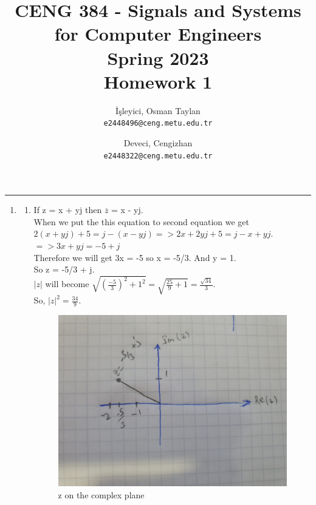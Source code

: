 \documentclass[10pt,a4paper, margin=1in]{article}
\author{
  İşleyici, Osman Taylan\\
  \texttt{e2448496@ceng.metu.edu.tr}
  \and
  Deveci, Cengizhan\\
  \texttt{e2448322@ceng.metu.edu.tr}
}
\title{CENG 384 - Signals and Systems for Computer Engineers \\
Spring 2023 \\
Homework 1}
\begin{document}
\maketitle



\noindent\rule{19cm}{1.2pt}

\begin{enumerate}

    \item %
          \begin{enumerate}
              \item %
              If z = x + yj then $\overline{z}$ = x - yj. \\
              
              When we put the this equation to second equation we get $2(x + yj) + 5 = j - (x-yj) => 2x + 2yj + 5 = j - x + yj$.\\
              
              $=> 3x + yj = -5 + j$ \\

              Therefore we will get 3x = -5 so x = -5/3. And y = 1. \\

              So z = -5/3 + j. \\

              $|z|$ will become $\sqrt{(\frac{-5}{3})^2 + 1^2} = \sqrt{\frac{25}{9} + 1} = \frac{\sqrt{34}}{3}$. \\

              So, $|z|^2 = \frac{34}{9}$.

              \begin{figure}[H]
              \centering
              \includegraphics[scale=0.25, angle=90]{hw1_q1.jpg}
              \caption{z on the complex plane}
                \end{figure}
              

\end{enumerate}
\end{enumerate}
\end{document}
